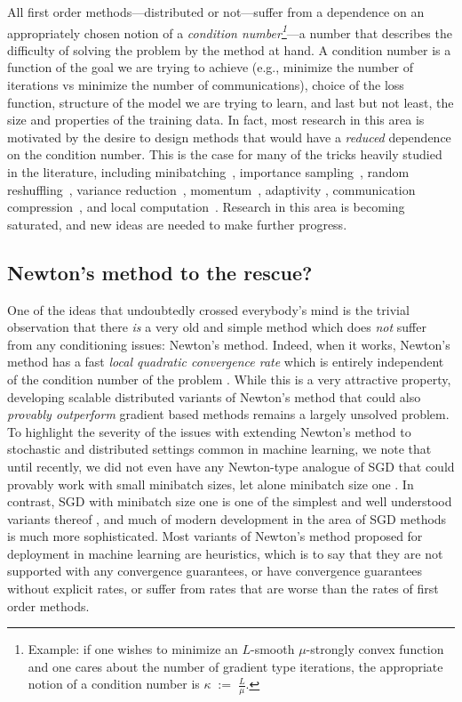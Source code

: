 \documentclass[12pt]{article}
\newcommand{\eqdef}{\; { := }\;}
\begin{document}
All first order methods---distributed or not---suffer from a dependence on an appropriately chosen notion of a {\em condition number\footnote{Example: if one wishes to minimize an $L$-smooth $\mu$-strongly convex function  and one cares about the number of gradient type iterations, the appropriate notion of a condition number is $\kappa \eqdef \frac{L}{\mu}$.}}---a number that describes the difficulty of solving the problem by the method at hand. A condition number is a function of the goal we are trying to achieve (e.g., minimize the number of iterations vs minimize the  number of communications), choice of the loss function, structure of the model we are trying to learn, and last but not least, the size and properties of the training data. In fact, most research in this area is motivated by the desire to design methods that would have a {\em reduced} dependence on the condition number. This is the case for many of the tricks heavily studied in the literature, including minibatching~\citep{pegasos2}, importance sampling~\citep{NeedellWard2015, IProx-SDCA}, random reshuffling~\citep{RR}, variance reduction~\citep{schmidt2017minimizing, johnson2013accelerating, proxSVRG, SAGA}, momentum~\citep{SHB-NIPS, SMOMENTUM}, adaptivity \citep{MM2019}, communication compression~\citep{Alistarh17, Bernstein18, DIANA}, and local computation~\citep{COCOA+journal, localSGD-Stich,localSGD-AISTATS2020}.  Research in this area is becoming saturated, and new ideas are needed to make further progress.

\subsection{Newton's method to the rescue?} One of the ideas that undoubtedly crossed everybody's mind is the trivial observation that there {\em is} a very old and simple method which does {\em not} suffer from any conditioning issues: Newton's method. Indeed, when it works, Newton's method has a fast {\em local quadratic convergence rate} which is entirely independent of the condition number of the problem \citep{Beck-book-nonlinear}. While this is a very attractive property, developing  scalable distributed variants of Newton's method that could also {\em provably outperform} gradient based methods remains a largely unsolved problem. To highlight the severity of the issues with extending Newton's method to stochastic and distributed settings common in machine learning, we note that until recently, we did not even have any Newton-type analogue of SGD that could provably work with small minibatch sizes, let alone minibatch size one \citep{SN2019}. In contrast, SGD with minibatch size one is one of the simplest and well understood variants thereof \citep{NeedellWard2015}, and much of modern development in the area of SGD methods is much more sophisticated.  Most variants of Newton's method proposed for deployment in machine learning are heuristics, which is to say that they are not supported with any convergence guarantees, or have convergence guarantees without explicit rates, or suffer from rates that are worse than the rates of first order methods.  
\end{document}
